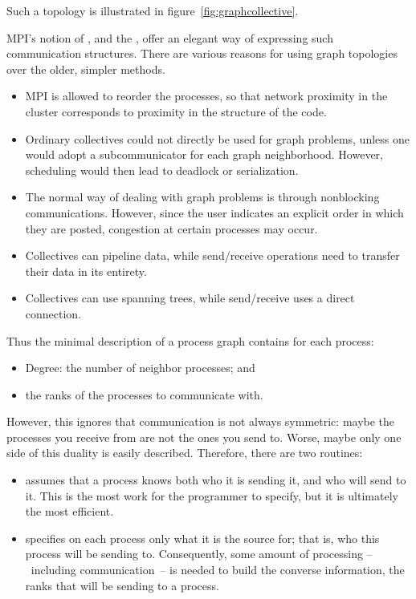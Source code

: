 Such a topology is illustrated in figure~\ref{fig:graphcollective}.

MPI's notion of , and the
, offer an elegant way of
expressing such communication structures. There are various reasons
for using graph topologies over the older, simpler methods.
\begin{itemize}
\item MPI is allowed to reorder the processes, so that network proximity
  in the cluster corresponds to proximity in the structure of the
  code.
\item Ordinary collectives could not directly be used for graph
  problems, unless one would adopt a subcommunicator for each graph
  neighborhood. However, scheduling would then lead to deadlock or
  serialization.
\item The normal way of dealing with graph problems is through
  nonblocking communications. However, since the user indicates an
  explicit order in which they are posted, congestion at certain
  processes may occur.
\item Collectives can pipeline data, while send/receive operations
  need to transfer their data in its entirety.
\item Collectives can use spanning trees, while send/receive uses a
  direct connection.
\end{itemize}

Thus the minimal description of a process graph contains for each process:
\begin{itemize}
\item Degree: the number of neighbor processes; and
\item the ranks of the processes to communicate with.
\end{itemize}
However, this ignores that communication is not always symmetric:
maybe the processes you receive from are not the ones you send
to.
Worse, maybe only one side of this duality is easily described.
Therefore, there are two routines:
\begin{itemize}
\item {} assumes that a
  process knows both who it is sending it, and who will send to
  it. This is the most work for the programmer to specify, but it is
  ultimately the most efficient.
\item {} specifies on each process
  only what it is the source for; that is, who this process will be sending
  to. Consequently, some amount of processing
  --~including communication~-- is needed to build the converse
  information, the ranks that will be sending to a process.
\end{itemize}

